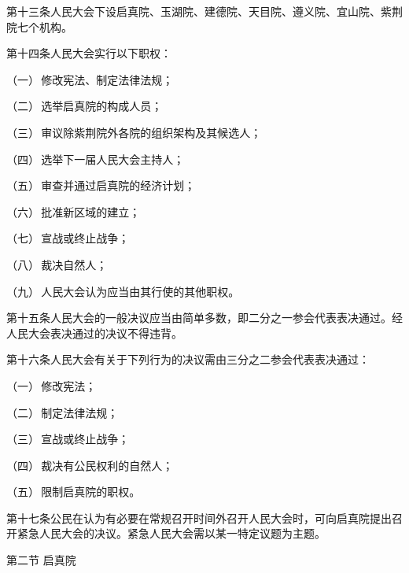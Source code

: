 {\noindent 第十三条\quad 人民大会下设启真院、玉湖院、建德院、天目院、遵义院、宜山院、紫荆院七个机构。

\noindent 第十四条\quad 人民大会实行以下职权：

\hspace*{2em}（一）\,修改宪法、制定法律法规；

\hspace*{2em}（二）\,选举启真院的构成人员；

\hspace*{2em}（三）\,审议除紫荆院外各院的组织架构及其候选人；

\hspace*{2em}（四）\,选举下一届人民大会主持人；

\hspace*{2em}（五）\,审查并通过启真院的经济计划；

\hspace*{2em}（六）\,批准新区域的建立；

\hspace*{2em}（七）\,宣战或终止战争；

\hspace*{2em}（八）\,裁决自然人；

\hspace*{2em}（九）\,人民大会认为应当由其行使的其他职权。

\noindent 第十五条\quad 人民大会的一般决议应当由简单多数，即二分之一参会代表表决通过。经人民大会表决通过的决议不得违背。

\noindent 第十六条\quad 人民大会有关于下列行为的决议需由三分之二参会代表表决通过：

\hspace*{2em}（一）\,修改宪法；

\hspace*{2em}（二）\,制定法律法规；

\hspace*{2em}（三）\,宣战或终止战争；

\hspace*{2em}（四）\,裁决有公民权利的自然人；

\hspace*{2em}（五）\,限制启真院的职权。

\noindent 第十七条\quad 公民在认为有必要在常规召开时间外召开人民大会时，可向启真院提出召开紧急人民大会的决议。紧急人民大会需以某一特定议题为主题。

\vspace{0.6\baselineskip}

第二节\,\,启真院

}
